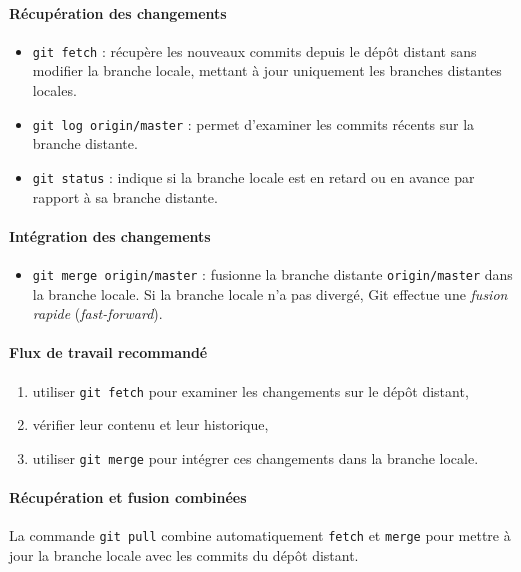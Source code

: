 \documentclass{article}
\begin{document}
\paragraph{Récupération des changements}
\begin{itemize}
    \item \texttt{git fetch} : récupère les nouveaux commits depuis le dépôt distant sans modifier la branche locale, mettant à jour uniquement les branches distantes locales.
    \item \texttt{git log origin/master} : permet d’examiner les commits récents sur la branche distante.
    \item \texttt{git status} : indique si la branche locale est en retard ou en avance par rapport à sa branche distante.
\end{itemize}

\paragraph{Intégration des changements}
\begin{itemize}
    \item \texttt{git merge origin/master} : fusionne la branche distante \texttt{origin/master} dans la branche locale. Si la branche locale n’a pas divergé, Git effectue une \emph{fusion rapide} (\emph{fast-forward}).
\end{itemize}

\paragraph{Flux de travail recommandé}
\begin{enumerate}
    \item utiliser \texttt{git fetch} pour examiner les changements sur le dépôt distant,
    \item vérifier leur contenu et leur historique,
    \item utiliser \texttt{git merge} pour intégrer ces changements dans la branche locale.
\end{enumerate}

\paragraph{Récupération et fusion combinées}
La commande \texttt{git pull} combine automatiquement \texttt{fetch} et \texttt{merge} pour mettre à jour la branche locale avec les commits du dépôt distant.
\end{document}
